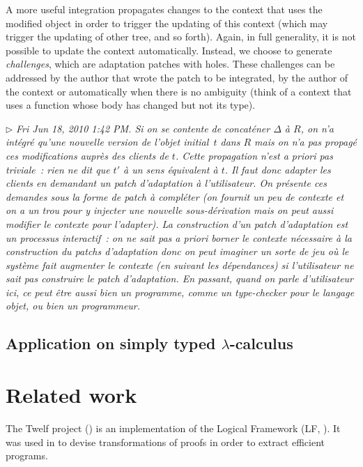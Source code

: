 \documentclass{article}
\newcommand{\remtext}[1]{\textcolor{bwgreen}{$\triangleright$ \textsl{#1}}}
\begin{document}
A more useful integration propagates changes to the context that uses
the modified object in order to trigger the updating of this context
(which may trigger the updating of other tree, and so forth). Again,
in full generality, it is not possible to update the context
automatically. Instead, we choose to generate \textit{challenges},
which are adaptation patches with holes. These challenges can be
addressed by the author that wrote the patch to be integrated, by the
author of the context or automatically when there is no ambiguity
(think of a context that uses a function whose body has changed but
not its type).

\remtext{Fri Jun 18, 2010 1:42 PM. Si on se contente de concaténer
  $\Delta$ à $R$, on n'a intégré qu'une nouvelle version de l'objet
  initial~$t$ dans $R$ mais on n'a pas propagé ces modifications
  auprès des clients de $t$. Cette propagation n'est \textit{a priori}
  pas triviale~: rien ne dit que $t'$ à un sens équivalent à $t$. Il
  faut donc adapter les clients en demandant un patch d'adaptation à
  l'utilisateur. On présente ces demandes sous la forme de patch à
  compléter (on fournit un peu de contexte et on a un trou pour y
  injecter une nouvelle sous-dérivation mais on peut aussi modifier le
  contexte pour l'adapter). La construction d'un patch d'adaptation
  est un processus interactif~: on ne sait pas a priori borner le
  contexte nécessaire à la construction du patchs d'adaptation donc on
  peut imaginer un sorte de jeu où le système fait augmenter le
  contexte (en suivant les dépendances) si l'utilisateur ne sait pas
  construire le patch d'adaptation. En passant, quand on parle
  d'utilisateur ici, ce peut être aussi bien un programme, comme un
  type-checker pour le langage objet, ou bien un programmeur.}

\subsection{Application on simply typed $\lambda$-calculus}

\section{Related work}
\label{rw}

The \textsf{Twelf} project (\cite{pfenning1999system}) is an
implementation of the Logical Framework (LF,
\cite{harper1993framework}). It was used in \cite{anderson1993program}
to devise transformations of proofs in order to extract efficient
programs.
\end{document}

